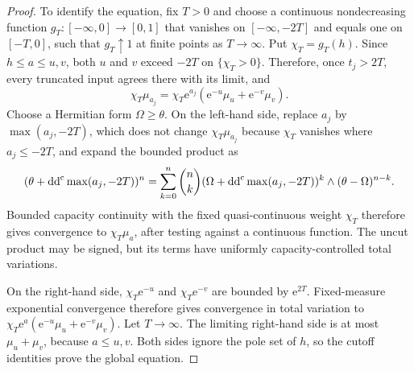 \begin{proof}
To identify the equation, fix $T>0$ and choose a continuous nondecreasing function $g_T\colon[-\infty,0]\to[0,1]$ that vanishes on $[-\infty,-2T]$ and equals one on $[-T,0]$, such that $g_T\uparrow1$ at finite points as $T\to\infty$. Put $\chi_T=g_T(h)$. Since $h\leq a\leq u,v$, both $u$ and $v$ exceed $-2T$ on $\{\chi_T>0\}$. Therefore, once $t_j>2T$, every truncated input agrees there with its limit, and
\[
 \chi_T\mu_{a_j}
 =\chi_T\mathrm{e}^{a_j}(\mathrm{e}^{-u}\mu_u+\mathrm{e}^{-v}\mu_v).
\]
Choose a Hermitian form $\Omega\geq\theta$. On the left-hand side, replace $a_j$ by $\max(a_j,-2T)$, which does not change $\chi_T\mu_{a_j}$ because $\chi_T$ vanishes where $a_j\leq-2T$, and expand the bounded product as
\[
 (\theta+\mathrm{dd}^{\mathrm{c}}\max(a_j,-2T))^n
 =\sum_{k=0}^n\binom nk
   (\Omega+\mathrm{dd}^{\mathrm{c}}\max(a_j,-2T))^k\wedge(\theta-\Omega)^{n-k}.
\]
Bounded capacity continuity with the fixed quasi-continuous weight $\chi_T$ therefore gives convergence to $\chi_T\mu_a$, after testing against a continuous function. The uncut product may be signed, but its terms have uniformly capacity-controlled total variations.

On the right-hand side, $\chi_T \mathrm{e}^{-u}$ and $\chi_T \mathrm{e}^{-v}$ are bounded by $\mathrm{e}^{2T}$. Fixed-measure exponential convergence therefore gives convergence in total variation to
$\chi_T\mathrm{e}^a(\mathrm{e}^{-u}\mu_u+\mathrm{e}^{-v}\mu_v)$. Let $T\to\infty$. The limiting right-hand side is at most $\mu_u+\mu_v$, because $a\leq u,v$. Both sides ignore the pole set of $h$, so the cutoff identities prove the global equation.
\end{proof}

